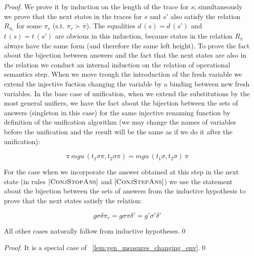 \begin{proof}
We prove it by induction on the length of the trace for $s$; simultaneously we prove that the next states in the traces for $s$ and $s'$ also satisfy the relation $R_{\pi_r}$ for some $\pi_r$ (s.t. $\pi_r \succ \pi$). The equalities $d\,(s) = d\,(s')$ and $t\,(s) = t\,(s')$ are obvious in this induction, because states in the relation $R_{\pi}$ always have the same form (and therefore the same left height). To prove the fact about the bijection between answers and the fact that the next states are also in the relation we conduct an internal induction on the relation of operational semantics step. When we move trough the introduction of the fresh variable we extend the injective fuction changing the variable by a binding between new fresh variables. In the base case of unification, when we extend the substitutions by the most general unifiers, we have the fact about the bijection between the sets of answers (singleton in this case) for the same injective renaming function by definition of the unification algorithm (we may change the names of variables before the unification and the result will be the same as if we do it after the unification):

\[ \pi \, mgu\,(t_1 \sigma \pi, t_2 \sigma \pi) = mgu\,(t_1 \sigma, t_2 \sigma) \, \pi  \]

For the case when we incorporate the answer obtained at this step in the next state (in rules $\mbox{[\textsc{ConjStopAns}]}$ and $\mbox{[\textsc{ConjStepAns}]}$) we use the statement about the bijection between the sets of answers from the inductive hypothesis to prove that the next states satisfy the relation:

\[ g \sigma \delta \pi_r = g \sigma \pi \delta' = g' \sigma' \delta'  \] 

All other cases naturally follow from inductive hypotheses.\qed

\end{proof}

\begin{proof}
It is a special case of \lemmaword~\ref{lem:gen_measures_changing_env}.\qed
\end{proof}

